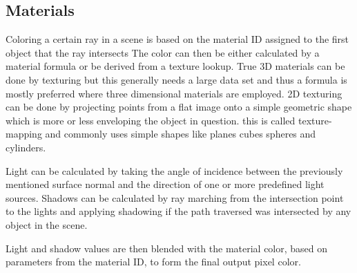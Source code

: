 			\subsection{Materials}
				Coloring a certain ray in a scene is based on the material ID
				assigned to the first object that the ray intersects The color
				can then be either calculated by a material formula or be 
				derived from a texture lookup. True 3D materials can be done by
				texturing but this generally needs a large data set and thus a 
				formula is mostly preferred where three dimensional materials 
				are employed. 2D texturing can be done by projecting points from
				a flat image onto a simple geometric shape  which is more or less 
				enveloping the object in question. this is called texture-mapping 
				and commonly uses simple shapes like planes cubes spheres and 
				cylinders. 
				
				Light can be calculated by taking the angle of incidence between
				the previously mentioned surface normal and the direction of one 
				or more predefined light sources. Shadows can be calculated by 
				ray marching from the intersection point to the lights and 
				applying shadowing if the path traversed was intersected by any
				object in the scene. 
				
				Light and shadow values are then blended with the material color,
				based on parameters from the material ID, to form the final 
				output pixel color.
						
		
